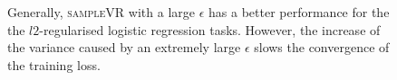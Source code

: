 \documentclass[letterpaper]{article}
\begin{document}
\begin{figure}[t]
\centering
{}
\caption{Generally, \textsc{sampleVR} with a large $\epsilon$ has a better performance for the the $l2$-regularised logistic regression tasks. However,  the increase of the variance caused by an extremely large $\epsilon$ slows the convergence of the training loss.}
\label{figure_logistic_regression_rho}
\end{figure}
\end{document}
